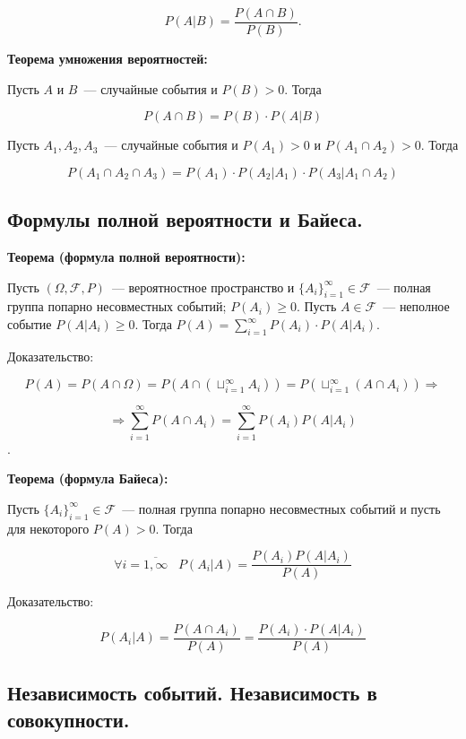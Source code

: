     \[
        P(A|B) = \frac{P(A \cap B)}{P(B)}.  
    \]
    \bigskip

\textbf{Теорема умножения вероятностей:}
    \smallskip
    
    Пусть $A$ и $B$~--- случайные события и $P(B) > 0$. Тогда 

    \[
        P(A \cap B) = P(B) \cdot P(A|B)  
    \]
    \bigskip

    Пусть $A_1, A_2, A_3$~--- случайные события и $P(A_1) > 0$ и $P(A_1 \cap A_2) > 0$.
    Тогда

    \[
        P(A_1 \cap A_2 \cap A_3) = P(A_1) \cdot P(A_2|A_1) \cdot P(A_3|A_1 \cap A_2)  
    \]

\subsection{Формулы полной вероятности и Байеса.}

\textbf{Теорема (формула полной вероятности):}
    \smallskip

    Пусть $(\Omega, \mathcal{F}, P)$~--- вероятностное пространство и
    $\{A_i\}^{\infty}_{i = 1} \in \mathcal{F}$~--- полная группа
    попарно несовместных событий; $P(A_i) \geq 0$. Пусть $A \in \mathcal{F}$~---
    неполное событие $P(A|A_i) \geq 0$. Тогда $P(A) = \sum^{\infty}_{i = 1} P(A_i)
    \cdot P(A|A_i)$.
    \bigskip

    Доказательство:
    \bigskip

    $$P(A) = P(A \cap \Omega) = P(A \cap (\sqcup^{\infty}_{i = 1} A_i)) =
    P(\sqcup^{\infty}_{i = 1}(A \cap A_i)) \Rightarrow$$

    $$\Rightarrow \sum^{\infty}_{i = 1} P (A \cap A_i) = \sum^{\infty}_{i = 1}
    P(A_i)P(A|A_i)$$.
    \bigskip

\textbf{Теорема (формула Байеса):}
    \smallskip
    
    Пусть $\{A_i\}^{\infty}_{i = 1} \in \mathcal{F}$~--- полная группа
    попарно несовместных событий и пусть для некоторого $P(A) > 0$. Тогда

    \[
        \forall i = \overline{1, \infty} \;\;\; P(A_i|A) = 
        \frac{P(A_i)P(A|A_i)}{P(A)}  
    \]
    \bigskip

    Доказательство:
    \bigskip

    \[
        P(A_i|A) = \frac{P(A \cap A_i)}{P(A)} = \frac{P(A_i) \cdot P(A|A_i)}{P(A)}  
    \]

\subsection{Независимость событий. Независимость в совокупности.}

